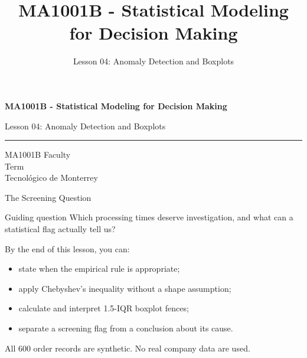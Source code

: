 \documentclass[aspectratio=169,10pt,english]{beamer}
\title{MA1001B - Statistical Modeling for Decision Making}
\subtitle{Lesson 04: Anomaly Detection and Boxplots}
\author{}
\institute{Tecnol\'ogico de Monterrey}
\date{}
\begin{document}
\begin{frame}[plain]
  \vspace{1.2cm}
  {\Large\bfseries MA1001B - Statistical Modeling for Decision Making\par}
  \vspace{0.7cm}
  {\large Lesson 04: Anomaly Detection and Boxplots\par}
  \vspace{0.7cm}
  {\color{TecRojo}\rule{\textwidth}{1.2pt}}
  \vspace{0.8cm}

  MA1001B Faculty\\[0.3cm]
  Term\\[0.3cm]
  Tecnol\'ogico de Monterrey
\end{frame}

\begin{frame}{The Screening Question}
  \begin{alertblock}{Guiding question}
    Which processing times deserve investigation, and what can a statistical
    flag actually tell us?
  \end{alertblock}

  \vspace{0.5em}
  By the end of this lesson, you can:
  \begin{itemize}
    \item state when the empirical rule is appropriate;
    \item apply Chebyshev's inequality without a shape assumption;
    \item calculate and interpret 1.5-IQR boxplot fences;
    \item separate a screening flag from a conclusion about its cause.
  \end{itemize}

  \vfill
  \scriptsize All 600 order records are synthetic. No real company data are used.
\end{frame}
\end{document}
